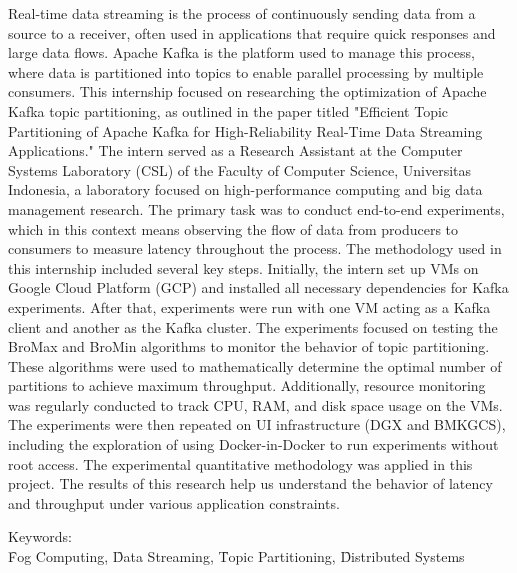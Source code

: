 \noindent Real-time data streaming is the process of continuously sending data from a source to a receiver, often used in applications that require quick responses and large data flows. Apache Kafka is the platform used to manage this process, where data is partitioned into topics to enable parallel processing by multiple consumers. This internship focused on researching the optimization of Apache Kafka topic partitioning, as outlined in the paper titled "Efficient Topic Partitioning of Apache Kafka for High-Reliability Real-Time Data Streaming Applications." The intern served as a Research Assistant at the Computer Systems Laboratory (CSL) of the Faculty of Computer Science, Universitas Indonesia, a laboratory focused on high-performance computing and big data management research. The primary task was to conduct end-to-end experiments, which in this context means observing the flow of data from producers to consumers to measure latency throughout the process. The methodology used in this internship included several key steps. Initially, the intern set up VMs on Google Cloud Platform (GCP) and installed all necessary dependencies for Kafka experiments. After that, experiments were run with one VM acting as a Kafka client and another as the Kafka cluster. The experiments focused on testing the BroMax and BroMin algorithms to monitor the behavior of topic partitioning. These algorithms were used to mathematically determine the optimal number of partitions to achieve maximum throughput. Additionally, resource monitoring was regularly conducted to track CPU, RAM, and disk space usage on the VMs. The experiments were then repeated on UI infrastructure (DGX and BMKGCS), including the exploration of using Docker-in-Docker to run experiments without root access. The experimental quantitative methodology was applied in this project. The results of this research help us understand the behavior of latency and throughput under various application constraints. \\

\vspace*{0.2cm}

\noindent Keywords: \\ \f{Fog Computing}, \f{Data Streaming}, \f{Topic Partitioning}, \f{Distributed Systems} \\

\newpage

